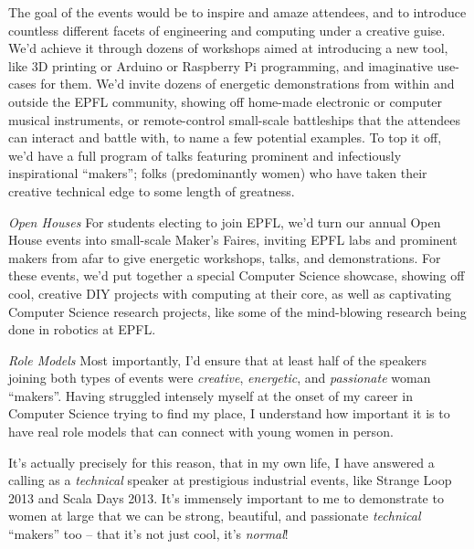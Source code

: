\documentclass[acmtocl]{acmtrans2m}
\begin{document}
The goal of the events would be to inspire and amaze attendees, and to
introduce countless different facets of engineering and computing under a
creative guise. We'd achieve it through dozens of workshops aimed at
introducing a new tool, like 3D printing or Arduino or Raspberry Pi
programming, and imaginative use-cases for them. We'd invite dozens of
energetic demonstrations from within and outside the EPFL community, showing
off home-made electronic or computer musical instruments, or remote-control
small-scale battleships that the attendees can interact and battle with, to
name a few potential examples. To top it off, we'd have a full program of
talks featuring prominent and infectiously inspirational ``makers''; folks
(predominantly women) who have taken their creative technical edge to some
length of greatness.

\textit{\textsf{Open Houses}}\newline
For students electing to join EPFL, we'd turn our annual Open House events
into {small-scale} Maker's Faires, inviting EPFL labs and prominent makers
from afar to give energetic workshops, talks, and demonstrations. For these
events, we'd put together a special Computer Science showcase, showing
off cool, creative DIY projects with computing at their core, as well as
captivating Computer Science research projects, like some of the mind-blowing
research being done in robotics at EPFL.

\textit{\textsf{Role Models}}\newline
Most importantly, I'd ensure that at least half of the speakers joining both
types of events were \textit{creative}, \textit{energetic}, and
\textit{passionate} woman ``makers''. Having struggled intensely myself at the
onset of my career in Computer Science trying to find my place, I understand
how important it is to have real role models that can connect with young women
in person.

It's actually precisely for this reason, that in my own life, I have answered
a calling as a \textit{technical} speaker at prestigious industrial events,
like Strange Loop 2013 and Scala Days 2013. It's immensely important to me to
demonstrate to women at large that we can be strong, beautiful, and passionate
\textit{technical}  ``makers'' too -- that it's not just cool, it's \textit{normal}!


\end{document}
